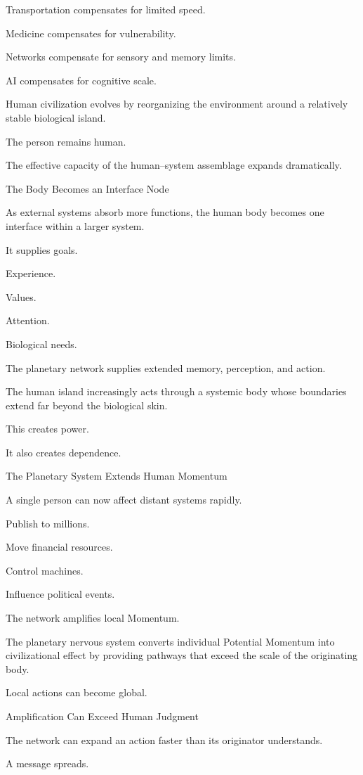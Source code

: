Transportation compensates for limited speed.

Medicine compensates for vulnerability.

Networks compensate for sensory and memory limits.

AI compensates for cognitive scale.

Human civilization evolves by reorganizing the environment around a relatively stable biological island.

The person remains human.

The effective capacity of the human–system assemblage expands dramatically.

The Body Becomes an Interface Node

As external systems absorb more functions, the human body becomes one interface within a larger system.

It supplies goals.

Experience.

Values.

Attention.

Biological needs.

The planetary network supplies extended memory, perception, and action.

The human island increasingly acts through a systemic body whose boundaries extend far beyond the biological skin.

This creates power.

It also creates dependence.

The Planetary System Extends Human Momentum

A single person can now affect distant systems rapidly.

Publish to millions.

Move financial resources.

Control machines.

Influence political events.

The network amplifies local Momentum.

The planetary nervous system converts individual Potential Momentum into civilizational effect by providing pathways that exceed the scale of the originating body.

Local actions can become global.

Amplification Can Exceed Human Judgment

The network can expand an action faster than its originator understands.

A message spreads.

